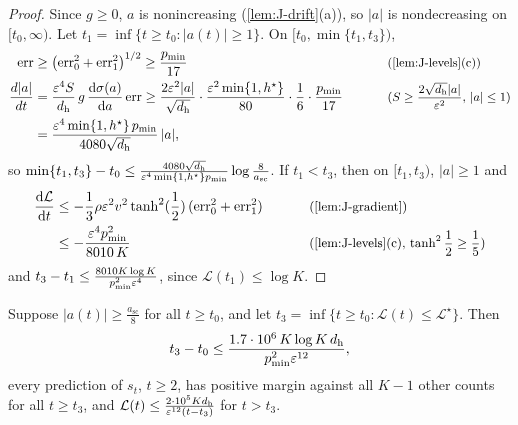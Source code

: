 \begin{proof}
Since $g\ge0$, $a$ is nonincreasing (\cref{lem:J-drift}(a)), so $|a|$ is nondecreasing on $[t_0,\infty)$. Let $t_1=\inf\{t\ge t_0:|a(t)|\ge1\}$. On
$[t_0,\min\{t_1,t_3\})$,
\begin{alignat*}{2}
 \mathrm{err}&\ge\bigl(\mathrm{err}_0^2+\mathrm{err}_1^2\bigr)^{1/2}\ge\frac{p_{\min}}{17} &\qquad& \why{\cref{lem:J-levels}(c)}\\
 \frac{d|a|}{dt}&=\frac{\initscale^4S}{d_{\mathrm h}}\,g\,\dd{\sigma(a)}{a}\,\mathrm{err}\ge\frac{2\initscale^2|a|}{\sqrt{d_{\mathrm h}}}\cdot\frac{\initscale^2\min\{1,h^\star\}}{80}\cdot\frac{1}{6}\cdot\frac{p_{\min}}{17} && \why{$S\ge\frac{2\sqrt{d_{\mathrm h}}|a|}{\initscale^2}$, $|a|\le1$}\\
 &=\frac{\initscale^4\min\{1,h^\star\}\,p_{\min}}{4080\sqrt{d_{\mathrm h}}}\,|a|,
\end{alignat*}
so $\min\{t_1,t_3\}-t_0\le\frac{4080\sqrt{d_{\mathrm h}}}{\varepsilon^4\min\{1,h^\star\}p_{\min}}\log\frac{8}{a_{\mathrm{sc}}}$. If $t_1<t_3$, then on $[t_1,t_3)$, $|a|\ge1$ and
\begin{alignat*}{2}
 \ddt{\mathcal L}&\le-\tfrac{1}{3}\rho\initscale^2v^2\tanh^2(\tfrac{1}{2})\,(\mathrm{err}_0^2+\mathrm{err}_1^2) &\qquad& \why{\cref{lem:J-gradient}}\\
 &\le-\frac{\initscale^4p_{\min}^2}{8010\,K} && \why{\cref{lem:J-levels}(c), $\tanh^2\tfrac{1}{2}\ge\tfrac{1}{5}$}
\end{alignat*}
and $t_3-t_1\le\frac{8010K\log K}{p_{\min}^2\varepsilon^4}$, since $\mathcal L(t_1)\le\log K$.
\end{proof}

\begin{lemma}[Descent]
\label{lem:J-descent}
Suppose $|a(t)|\ge\frac{a_{\mathrm{sc}}}{8}$ for all $t\ge t_0$, and let $t_3=\inf\{t\ge t_0:\mathcal L(t)\le \mathcal L^\star\}$. Then
\[
 t_3-t_0\le\frac{1.7\cdot10^6\,K\log K\,d_{\mathrm h}}{p_{\min}^2\varepsilon^{12}},
\]
every prediction of $s_t$, $t\ge2$, has positive margin against all $K-1$ other counts for all $t\ge t_3$, and
$\mathcal L(t)\le\frac{2\cdot10^5Kd_{\mathrm h}}{\varepsilon^{12}(t-t_3)}$ for $t>t_3$.
\end{lemma}

